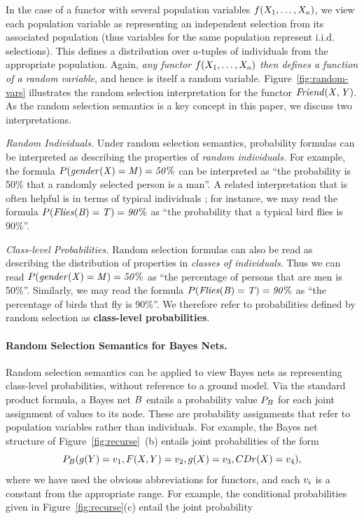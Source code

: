 \documentclass[oribibl]{llncs}
\begin{document}
In the case of a functor with several population variables $f(X_{1},\ldots,X_{a})$, we view each population variable as representing an independent selection from its associated population (thus variables for the same population represent i.i.d. selections). This defines a distribution over $a$-tuples of individuals from the appropriate population. Again, {\em any functor $f(X_{1},\ldots,X_{a})$ then defines a function of a random variable}, and hence is itself a random variable. Figure~\ref{fig:random-vars} illustrates the random selection interpretation for the functor $\it{Friend}(X,Y)$. 
%
As the random selection semantics is a key concept in this paper, we discuss two interpretations.

{\em Random Individuals.} Under random selection semantics, probability formulas can be interpreted as describing the properties of {\em random individuals.} For example, the formula $P(\it{gender}(X) = M) = 50\%$ can be interpreted as ``the probability is 50\% that a randomly selected person is a man''. A related  interpretation that is often helpful is in terms of typical individuals \cite{Halpern90}; for instance, we may read the formula $P(\it{Flies}(B) = \mathit{T}) = 90\%$ as ``the probability that a typical bird flies is 90\%''. 

{\em Class-level Probabilities.} Random selection formulas can also be read as describing the distribution of properties in {\em classes of individuals}. Thus we can read $P(\it{gender}(X) = M) = 50\%$ as ``the percentage of persons that are men is 50\%''. Similarly, we may read the formula $P(\it{Flies}(B) = \mathit{T}) = 90\%$ as ``the percentage of birds that fly is 90\%''. We therefore refer to probabilities defined by random selection as \textbf{class-level probabilities}. 

\paragraph{Random Selection Semantics for Bayes Nets.}
Random selection semantics can be applied to view Bayes nets as representing class-level probabilities, without reference to a ground model.
Via the standard product formula, a Bayes net $B$ entails a probability value $P_{B}$ for each joint assignment of values to its  node. These are probability assignments that refer to population variables rather than individuals.
For example, the Bayes net structure of Figure~\ref{fig:recurse}~(b) entails joint probabilities of the form $$P_{B}(g(Y)=v_{1}, F(X,Y)=v_{2}, g(X) = v_{3}, CDr(X)=v_{4}),$$ where we have used the obvious abbreviations for functors, and each $v_{i}$ is a constant from the appropriate range. For example,  the conditional probabilities given in Figure~\ref{fig:recurse}(c) entail the joint probability
\end{document}
